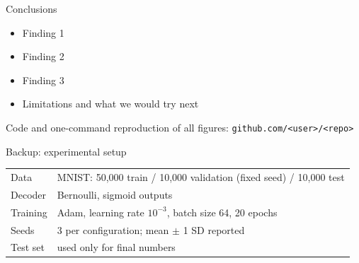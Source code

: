 \documentclass[aspectratio=169,11pt]{beamer}
\begin{document}
\begin{frame}{Conclusions}
  \begin{itemize}
    \item Finding 1
    \item Finding 2
    \item Finding 3
    \item Limitations and what we would try next
  \end{itemize}
  \vfill
  \small Code and one-command reproduction of all figures:
  \texttt{github.com/<user>/<repo>}
\end{frame}

\appendix

\begin{frame}{Backup: experimental setup}
  \small
  \begin{tabular}{ll}
    \toprule
    Data & MNIST: 50{,}000 train / 10{,}000 validation (fixed seed) / 10{,}000 test \\
    Decoder & Bernoulli, sigmoid outputs \\
    Training & Adam, learning rate $10^{-3}$, batch size 64, 20 epochs \\
    Seeds & 3 per configuration; mean $\pm$ 1 SD reported \\
    Test set & used only for final numbers \\
    \bottomrule
  \end{tabular}
\end{frame}
\end{document}
